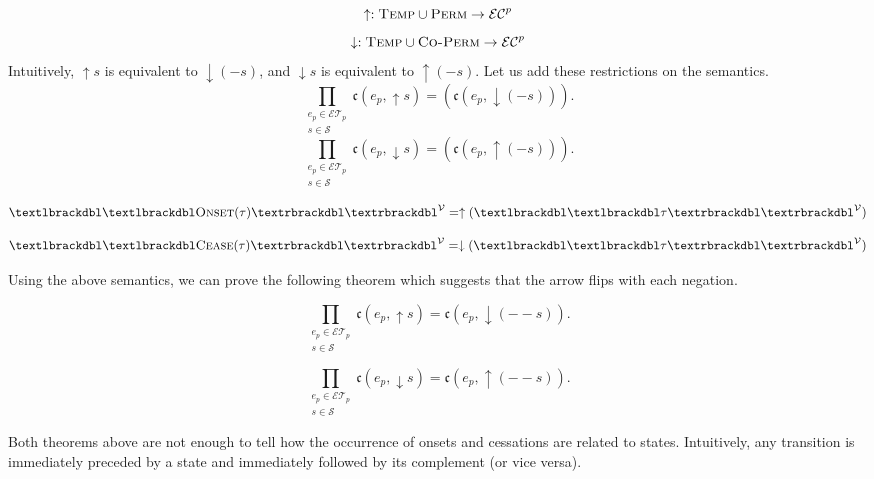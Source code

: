 $$\uparrow :  \textsc{Temp} \cup \textsc{Perm} \to \mathcal{EC}^p$$
$$\downarrow :  \textsc{Temp} \cup \textsc{Co-Perm} \to \mathcal{EC}^p$$
Intuitively, $\uparrow s$ is equivalent to $\downarrow(-s)$, and $\downarrow s$ is equivalent to $\uparrow(-s)$. Let us add these restrictions on the semantics.
\begin{equation}
	\prod_{\substack{e_p \in \mathcal{ET}_p \\ s \in \mathcal{S}}} \mathfrak{c}(e_p, \uparrow s) = (\mathfrak{c}(e_p, \downarrow(- s))).
\end{equation}
\begin{equation}\label{ax:cessation}
	\prod_{\substack{e_p \in \mathcal{ET}_p \\ s \in \mathcal{S}}}\mathfrak{c}(e_p, \downarrow s) = (\mathfrak{c}(e_p, \uparrow(- s))).
\end{equation}

\[
	\textlbrackdbl\textlbrackdbl \textsc{Onset}(\tau) \textrbrackdbl \textrbrackdbl^{\mathcal{V}}
	= \uparrow(\textlbrackdbl \textlbrackdbl\tau \textrbrackdbl\textrbrackdbl^{\mathcal{V}})
\]

\[
	\textlbrackdbl\textlbrackdbl \textsc{Cease}(\tau) \textrbrackdbl\textrbrackdbl^{\mathcal{V}}
	= \downarrow(\textlbrackdbl \textlbrackdbl\tau \textrbrackdbl\textrbrackdbl^{\mathcal{V}})
\]


Using the above semantics, we can prove the following theorem which suggests that the arrow flips with each negation.

\begin{theorem}\label{thm:arrow_flip}
	\begin{equation}
		\prod_{\substack{e_p \in \mathcal{ET}_p \\ s \in \mathcal{S}}} \mathfrak{c}(e_p, \uparrow s) = \mathfrak{c}(e_p, \downarrow (-- s)).
	\end{equation}
\end{theorem}
\begin{theorem}
	\begin{equation}
		\prod_{\substack{e_p \in \mathcal{ET}_p \\ s \in \mathcal{S}}}\mathfrak{c}(e_p, \downarrow s) = \mathfrak{c}(e_p, \uparrow (-- s)).
	\end{equation}
\end{theorem}

Both theorems above are not enough to tell how the occurrence of onsets and cessations are related to states.
Intuitively, any
transition is immediately preceded by a state and immediately followed by its complement (or vice versa).

